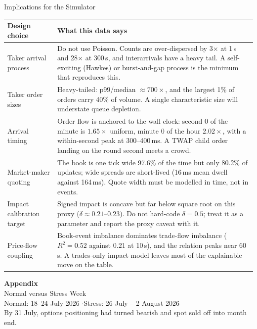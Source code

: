 \documentclass[aspectratio=169,10pt]{beamer}
\begin{document}
\begin{frame}{Implications for the Simulator}
\footnotesize
\begin{tabularx}{\textwidth}{@{}L{0.62}L{1.38}@{}}
\toprule
\textbf{Design choice} & \textbf{What this data says} \\
\midrule
Taker arrival process &
Do not use Poisson. Counts are over-dispersed by 3$\times$ at 1\,s and 28$\times$ at 300\,s, and
interarrivals have a heavy tail. A self-exciting (Hawkes) or burst-and-gap process is the minimum
that reproduces this. \\[3pt]
Taker order sizes &
Heavy-tailed: p99/median $\approx700\times$, and the largest 1\% of orders carry 40\% of volume.
A single characteristic size will understate queue depletion. \\[3pt]
Arrival timing &
Order flow is anchored to the wall clock: second 0 of the minute is $1.65\times$ uniform, minute 0
of the hour $2.02\times$, with a within-second peak at 300--400\,ms. A TWAP child order landing on
the round second meets a crowd. \\[3pt]
Market-maker quoting &
The book is one tick wide 97.6\% of the time but only 80.2\% of updates; wide spreads are
short-lived (16\,ms mean dwell against 164\,ms). Quote width must be modelled in time, not in
events. \\[3pt]
Impact calibration target &
Signed impact is concave but far below square root on this proxy
($\delta\approx0.21$--$0.23$). Do not hard-code $\delta=0.5$; treat it as a parameter and report
the proxy caveat with it. \\[3pt]
Price-flow coupling &
Book-event imbalance dominates trade-flow imbalance ($R^2=0.52$ against $0.21$ at 10\,s), and the
relation peaks near 60\,s. A trades-only impact model leaves most of the explainable move on the
table. \\
\bottomrule
\end{tabularx}
\end{frame}
\appendix

\begin{frame}[plain]
  \centering
  \vfill
  {\Large\bfseries Appendix}\\[4pt]
  {\normalsize Normal versus Stress Week}\\[10pt]
  {\footnotesize Normal: 18--24 July 2026 \quad$\cdot$\quad Stress: 26 July -- 2 August 2026}\\[2pt]
  {\footnotesize By 31 July, options positioning had turned bearish and spot sold off into month end.}
  \vfill
\end{frame}
\end{document}
